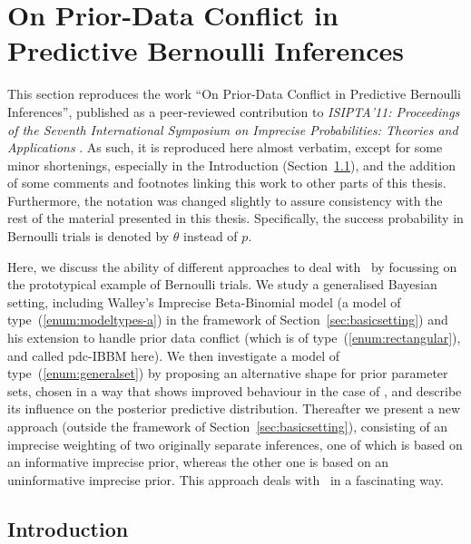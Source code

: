 \section{On Prior-Data Conflict in Predictive Bernoulli Inferences}
\label{sec:isipta11}

This section reproduces the work
``On Prior-Data Conflict in Predictive Bernoulli Inferences'',
published as a peer-reviewed contribution to
\emph{ISIPTA'11: Proceedings of the Seventh International Symposium on
Imprecise Probabilities: Theories and Applications} \parencite{Walter2011a}.
As such, it is reproduced here almost verbatim,
except for some minor shortenings, especially in the Introduction (Section~\ref{sec:isipta11-intro}),
and the addition of some comments and footnotes linking this work to other parts of this thesis.
Furthermore, the notation was changed slightly to assure consistency with the rest of the material presented in this thesis.
Specifically, the success probability in Bernoulli trials is denoted by $\theta$ instead of $p$.

Here, we discuss the ability of different approaches to deal with \pdc\
by focussing on the prototypical example of Bernoulli trials.
We study a generalised Bayesian setting, including Walley's Imprecise Beta-Binomial model
(a model of type~(\ref{enum:modeltypes-a}) in the framework of Section~\ref{sec:basicsetting})
and his extension to handle prior data conflict (which is of type~(\ref{enum:rectangular}), and called pdc-IBBM here).
We then investigate a model of type~(\ref{enum:generalset}) by proposing an alternative shape for prior parameter sets,
chosen in a way that shows improved behaviour in the case of \pdc,
and describe its influence on the posterior predictive distribution.
Thereafter we present a new approach (outside the framework of Section~\ref{sec:basicsetting}),
consisting of an imprecise weighting of two originally separate inferences, one of which is based on an informative
imprecise prior, whereas the other one is based on an uninformative imprecise prior. This approach
deals with \pdc\ in a fascinating way.


\subsection{Introduction}
\label{sec:isipta11-intro}

